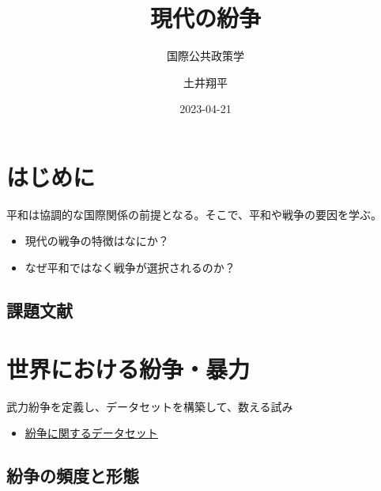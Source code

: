 \documentclass[
  xelatex,
  ja=standard]{bxjsarticle}
\title{現代の紛争}
\subtitle{国際公共政策学}
\author{土井翔平}
\date{2023-04-21}
\providecommand{\tightlist}{%
  \setlength{\itemsep}{0pt}\setlength{\parskip}{0pt}}\usepackage{longtable,booktabs,array}
\begin{document}
\maketitle
\ifdefined\Shaded\renewenvironment{Shaded}{\begin{tcolorbox}[boxrule=0pt, enhanced, borderline west={3pt}{0pt}{shadecolor}, interior hidden, frame hidden, breakable, sharp corners]}{\end{tcolorbox}}\fi

\hypertarget{ux306fux3058ux3081ux306b}{%
\section*{はじめに}\label{ux306fux3058ux3081ux306b}}

平和は協調的な国際関係の前提となる。そこで、平和や戦争の要因を学ぶ。

\begin{itemize}
\tightlist
\item
  現代の戦争の特徴はなにか？
\item
  なぜ平和ではなく戦争が選択されるのか？
\end{itemize}

\hypertarget{ux8ab2ux984cux6587ux732e}{%
\subsection*{課題文献}\label{ux8ab2ux984cux6587ux732e}}

\hypertarget{ux4e16ux754cux306bux304aux3051ux308bux7d1bux4e89ux66b4ux529b}{%
\section{世界における紛争・暴力}\label{ux4e16ux754cux306bux304aux3051ux308bux7d1bux4e89ux66b4ux529b}}

武力紛争を定義し、データセットを構築して、数える試み\citep[序章]{tago2020}

\begin{itemize}
\tightlist
\item
  \href{https://www.cao.go.jp/pko/pko_j/organization/researcher/atpkonow/article099.html}{紛争に関するデータセット}
\end{itemize}

\hypertarget{ux7d1bux4e89ux306eux983bux5ea6ux3068ux5f62ux614b}{%
\subsection{紛争の頻度と形態}\label{ux7d1bux4e89ux306eux983bux5ea6ux3068ux5f62ux614b}}
\end{document}
